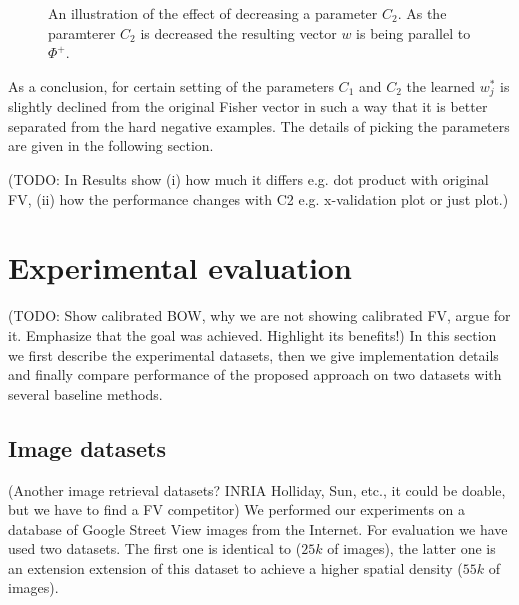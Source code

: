 \documentclass[table]{article} %
\begin{document}
\begin{figure}[t!]
    \centering
	    \begin{minipage}{0.48\linewidth}
	        \centering
	        \fbox{\rule[-.5cm]{0cm}{4cm} \rule[-.5cm]{6cm}{0cm}}
	    \end{minipage}
	    \begin{minipage}{0.48\linewidth}
	        \centering
	        \fbox{\rule[-.5cm]{0cm}{4cm} \rule[-.5cm]{6cm}{0cm}}
	    \end{minipage}
    \caption{An illustration of the effect of decreasing a parameter $C_2$. As the paramterer $C_2$ is decreased the resulting vector $w$ is being parallel to $\Phi^+$.}
    \label{fig:C2effect}
\end{figure}

  	As a conclusion, for certain setting of the parameters $C_1$ and $C_2$ the learned $w_j^*$ is slightly declined from the original Fisher vector in such a way that it is better separated from the hard negative examples. The details of picking the parameters are given in the following section.

  	\textcolor{myRed}{(TODO: In Results show (i) how much it differs e.g. dot product with original FV, (ii) how the performance changes with C2 e.g. x-validation plot or just plot.)}

\section{Experimental evaluation}
\label{sec:exp}
	\textcolor{myRed}{(TODO: Show calibrated BOW, why we are not showing calibrated FV, argue for it. Emphasize that the goal was achieved. Highlight its benefits!)}
	In this section we first describe the experimental datasets, then we give implementation details and finally compare performance of the proposed approach on two datasets with several baseline methods.

   	\subsection{Image datasets}
   		\textcolor{myRed}{(Another image retrieval datasets? INRIA Holliday, Sun, etc., it could be doable, but we have to find a FV competitor)}\newline
		We performed our experiments on a database of Google Street View images from the Internet. For evaluation we have used two datasets. The first one is identical to \cite{Gronat2013, Torii2011} ($25k$ of images), the latter one is an extension extension of this dataset to achieve a higher spatial density ($55k$ of images).
\end{document}
